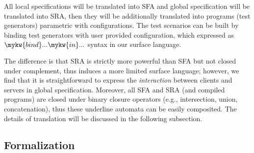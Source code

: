 All local specifications will be translated into SFA and global specification will be translated into SRA, then they will be additionally translated into  programs (test generators) parametric with configurations. The test scenarios can be built by binding test generators with user provided configuration, which expressed as $\mykw{bind} ... \mykw{in} ...$ syntax in our surface language.

The difference is that SRA is strictly more powerful than SFA but not closed under complement, thus induces a more limited surface language; however, we find that it is straightforward to express the \emph{interaction} between clients and servers in global specification. Moreover, all SFA and SRA (and compiled  programs) are closed under binary closure operators (e.g., intersection, union, concatenation), thus these underline automata can be easily composited. The details of translation will be discussed in the following subsection.

\subsection{Formalization}

